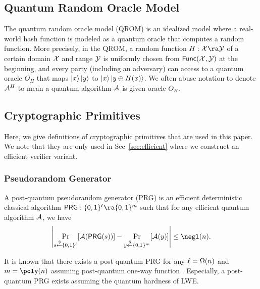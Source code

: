 \subsection{Quantum Random Oracle Model}
The quantum random oracle model (QROM) \cite{AC:BDFLSZ11} is an idealized model where a real-world hash function is modeled as a quantum oracle that computes a random function.
More precisely, in the QROM, a random function $H:\calX \ra \cal Y$ of a certain domain $\mathcal{X}$ and range $\mathcal{Y}$ is uniformly chosen from $\mathsf{Func}(\mathcal{X},\mathcal{Y})$ at the beginning, and every party (including an adversary) can access to a quantum oracle $O_H$ that maps $\ket{x}\ket{y}$ to $\ket{x}\ket{y\oplus H(x)}$.
We often abuse notation to denote $\mathcal{A}^{H}$ to mean a quantum algorithm $\mathcal{A}$ is given oracle $O_H$.  

\subsection{Cryptographic Primitives}
Here, we give definitions of cryptographic primitives that are used in this paper.
We note that they are only used in Sec~\ref{sec:efficient} where we construct an efficient verifier variant.

\subsubsection{Pseudorandom Generator}
A post-quantum pseudorandom generator (PRG) is an efficient deterministic classical algorithm $\PRG:\bit^{\ell} \ra \bit^{m}$ such that for any efficient quantum algorithm $\mathcal{A}$, we have
\begin{align*}
    \left|\Pr_{s\sample \bit^{\ell}}[\A(\PRG(s))]-\Pr_{y\sample \bit^{m}}[\A(y)]\right|\leq \negl(\secpar).
\end{align*}

It is known that there exists a post-quantum PRG for any $\ell=\Omega(n)$ and $m=\poly(\secpar)$ assuming post-quantum one-way function \cite{SIAM:HILL99,FOCS:Zhandry12}.
Especially, a post-quantum PRG exists assuming the quantum hardness of LWE.


